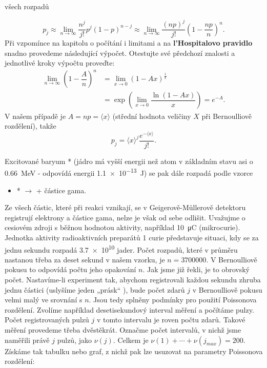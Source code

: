 \begin{mdframed}[style=mdexam]
\begin{example}
\begin{itemize}
            všech rozpadů
    \end{itemize}
    \begin{equation*}
      p_j \approx \lim\limits_{n\rightarrow\infty}\dfrac{n^j}{j!}p^j(1-p)^{n - j}
          \approx \lim\limits_{n\rightarrow\infty}\dfrac{(np)^j}{j!}\left(1-\dfrac{np}{n}\right)^{n}.
    \end{equation*}
    Při vzpomínce na kapitolu o počítání i limitami a na \textbf{l’Hospitalovo pravidlo} snadno
    provedeme následující výpočet. Otestujte své předchozí znalosti a jednotlivé kroky výpočtu
    proveďte:
    \begin{align*}
      \lim\limits_{n\rightarrow\infty}\left(1 - \dfrac{A}{n}\right)^n 
        &= \lim\limits_{x\rightarrow0}\left(1 - Ax\right)^\frac{1}{x}   \\
        &= \exp\left(\lim\limits_{x\rightarrow0}\dfrac{\ln(1 - Ax)}{x}\right) = e^{-A}.
    \end{align*}
    V našem případě je \(A = np = \langle x \rangle\) (střední hodnota veličiny \(X\) při
    Bernoulliově rozdělení), takže
    \begin{equation}\label{mai:eq065}
      p_j = \langle x \rangle^j\dfrac{e^{-\langle x \rangle}}{j!}.
    \end{equation}
 
    Excitované baryum * (jádro má vyšší energii než atom  v základním stavu
    asi o \qty{0.66}{\mega\electronvolt}  - odpovídá energii \qty{1.1e-13}{\joule}) se pak dále
    rozpadá podle vzorce
    \begin{itemize}
      \item {}* \(\longrightarrow\)  + částice gama.
    \end{itemize}

    Ze všech částic, které při reakci vznikají, se v Geigerově-Můllerově detektoru registrují
    elektrony a částice gama, nelze je však od sebe odlišit. Uvažujme o cesiovém zdroji s běžnou
    hodnotou aktivity, například \qty{10}{\micro\coulomb} (mikrocurie). Jednotka aktivity
    radioaktivních preparátů \num{1} curie představuje situaci, kdy se za jednu sekundu rozpadá
    \num{3.7e10} jader. Počet rozpadů, které v průměru nastanou třeba za deset sekund v našem
    vzorku, je \(n = \num{3700000}\). V Bernoulliově pokusu to odpovídá počtu jeho opakování \(n\).
    Jak jsme již řekli, je to obrovský počet. Nastavíme-li experiment tak, abychom registrovali
    každou sekundu zhruba jednu částici (uslyšíme jeden „prásk“ ), bude počet zdarů \(j\) v
    Bernoulliově pokusu velmi malý ve srovnání s \(n\). Jsou tedy splněny podmínky pro použití
    Poissonova rozdělení. Zvolíme například desetisekundový interval měření a počítáme pulzy. Počet
    registrovaných pulzů \(j\) v tomto intervalu je roven počtu zdarů. Takové měření provedeme třeba
    dvěstěkrát. Označme počet intervalů, v nichž jsme naměřili právě \(j\) pulzů, jako \(\nu(j)\).
    Celkem je \(\nu(1) + \cdots + \nu(j_{max}) = \num{200}\). Získáme tak tabulku nebo graf, z nichž
    pak lze usuzovat na parametry Poissonova rozdělení:


\end{example}
\end{mdframed}

